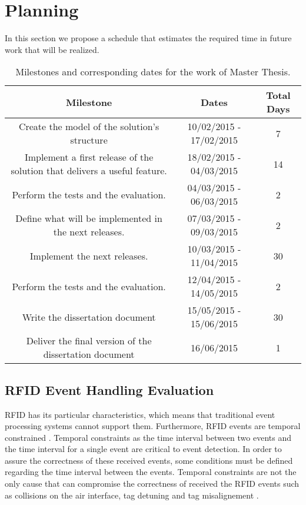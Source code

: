 \section{Planning}
\label{sec:Planning}
In this section we propose a schedule that estimates the required time in future work that will be realized.
\begin{table}[h]
  \begin{tabular}{|c|c|c|}
    \hline
    \textbf{Milestone}                                                         & \textbf{Dates}          & \textbf{Total Days} \\ \hline
    Create the model of the solution's structure                                & 10/02/2015 - 17/02/2015  & 7          \\ \hline
    Implement a first release of the solution that delivers a useful feature.   & 18/02/2015 - 04/03/2015  & 14         \\ \hline
    Perform the tests and the evaluation.                                       & 04/03/2015 - 06/03/2015  & 2          \\ \hline
    Define what will be implemented in the next releases.                       & 07/03/2015 - 09/03/2015  & 2          \\ \hline
    Implement the next releases.                                                & 10/03/2015 - 11/04/2015  & 30         \\ \hline
    Perform the tests and the evaluation.                                       & 12/04/2015 - 14/05/2015  & 2          \\ \hline
    Write the dissertation document                                             & 15/05/2015 - 15/06/2015  & 30         \\ \hline
    Deliver the final version of the dissertation document                      & 16/06/2015               & 1          \\ \hline
  \end{tabular}
  \caption {Milestones and corresponding dates for the work of Master Thesis.}
\end{table}


\subsection{RFID Event Handling Evaluation}
\label{sub:rfid_evaluation}
RFID has its particular characteristics, which means that traditional event processing systems
cannot support them. Furthermore, RFID events are temporal constrained \cite{wang2006bridging}.
Temporal constraints as the time interval between two events and the time interval for a single
event are critical to event detection. In order to assure the correctness of these received events,
some conditions must be defined regarding the time interval between the events. Temporal constraints
are not the only cause that can compromise the correctness of received the RFID events such as
collisions on the air interface, tag detuning and tag misalignement \cite{floerkemeier2004issues}.\\

